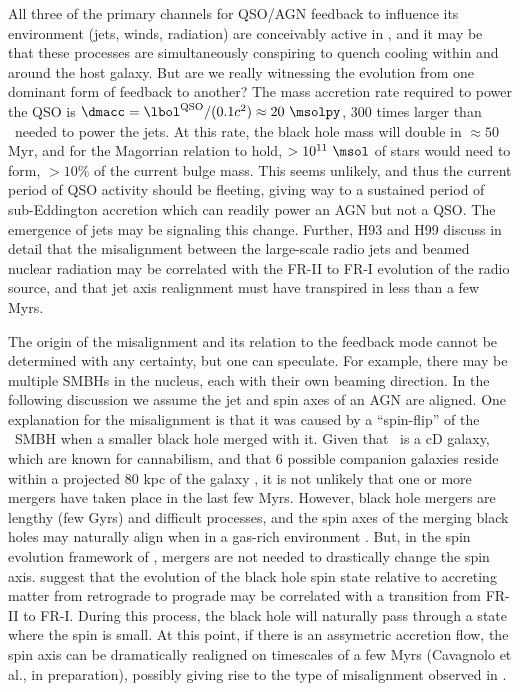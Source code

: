 \documentclass[useAMS,usenatbib]{mn2e}
\begin{document}
All three of the primary channels for QSO/AGN feedback to influence
its environment (jets, winds, radiation) are conceivably active in
\irs, and it may be that these processes are simultaneously conspiring
to quench cooling within and around the host galaxy. But are we really
witnessing the evolution from one dominant form of feedback to
another? The mass accretion rate required to power the QSO is $\dmacc
= \lqso/(0.1 c^2) \approx 20 ~\msolpy$, 300 times larger than
\dmacc\ needed to power the jets. At this rate, the black hole mass
will double in $\approx 50$ Myr, and for the Magorrian relation to
hold, $> 10^{11} ~\msol$ of stars would need to form, $> 10\%$ of the
current bulge mass. This seems unlikely, and thus the current period
of QSO activity should be fleeting, giving way to a sustained period
of sub-Eddington accretion which can readily power an AGN but not a
QSO. The emergence of jets may be signaling this change. Further, H93
and H99 discuss in detail that the misalignment between the
large-scale radio jets and beamed nuclear radiation may be correlated
with the FR-II to FR-I evolution of the radio source, and that jet
axis realignment must have transpired in less than a few Myrs.

The origin of the misalignment and its relation to the feedback mode
cannot be determined with any certainty, but one can speculate. For
example, there may be multiple SMBHs in the nucleus, each with their
own beaming direction. In the following discussion we assume the jet
and spin axes of an AGN are aligned. One explanation for the
misalignment is that it was caused by a ``spin-flip''
\citep{2002Sci...297.1310M} of the \irs\ SMBH when a smaller black
hole merged with it. Given that \irs\ is a cD galaxy, which are known
for cannabilism, and that 6 possible companion galaxies reside within
a projected 80 kpc of the galaxy \citep{1996AJ....111..649S,
  1999Ap&SS.266..113A}, it is not unlikely that one or more mergers
have taken place in the last few Myrs. However, black hole mergers are
lengthy (few Gyrs) and difficult processes, and the spin axes of the
merging black holes may naturally align when in a gas-rich environment
\citep{2007ApJ...661L.147B}. But, in the spin evolution framework of
\citet{2010arXiv1004.1166G}, mergers are not needed to drastically
change the spin axis. \citet{2010arXiv1004.1166G} suggest that the
evolution of the black hole spin state relative to accreting matter
from retrograde to prograde may be correlated with a transition from
FR-II to FR-I. During this process, the black hole will naturally pass
through a state where the spin is small. At this point, if there is an
assymetric accretion flow, the spin axis can be dramatically realigned
on timescales of a few Myrs (Cavagnolo et al., in preparation),
possibly giving rise to the type of misalignment observed in \irs.
\end{document}

